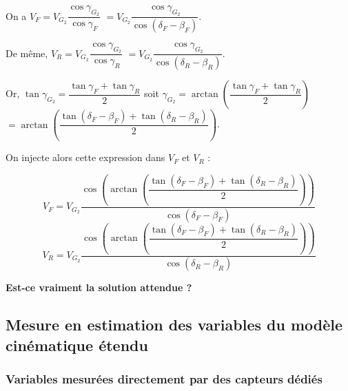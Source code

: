 \documentclass[11pt]{article}
\begin{document}
\begin{UPSTIcorrige}

On a $V_{F}  =V_{G_2} \dfrac{\cos \gamma_{G_2}}{\cos \gamma_{F}}$ 
$=V_{G_2} \dfrac{\cos \gamma_{G_2}}{\cos  \left(\delta_F-\beta_F \right)}$. 


De même, $V_{R}  =V_{G_2} \dfrac{\cos \gamma_{G_2}}{\cos \gamma_{R}}$ $=V_{G_2} \dfrac{\cos \gamma_{G_2}}{\cos  \left(\delta_R-\beta_R \right)}$.


Or, $\tan \gamma_{G_2} = \dfrac{\tan \gamma_F+\tan \gamma_R}{2}$ soit $ \gamma_{G_2} = \arctan\left(\dfrac{\tan \gamma_F+\tan \gamma_R}{2}\right)$ $= \arctan\left(\dfrac{\tan \left(\delta_F - \beta_F\right)+\tan \left(\delta_R - \beta_R\right)}{2}\right)$. 

On injecte alors cette expression dans $V_{F}$ et $V_R$ :

$$
V_F = V_{G_2} \dfrac{\cos \left( \arctan\left(\dfrac{\tan \left(\delta_F - \beta_F\right)+\tan \left(\delta_R - \beta_R\right)}{2}\right)\right)}{\cos  \left(\delta_F-\beta_F \right)} 
$$
$$
V_R = V_{G_2} \dfrac{\cos \left( \arctan\left(\dfrac{\tan \left(\delta_F - \beta_F\right)+\tan \left(\delta_R - \beta_R\right)}{2}\right)\right)}{\cos  \left(\delta_R-\beta_R \right)} 
$$

\textbf{Est-ce vraiment la solution attendue ?}

\end{UPSTIcorrige}


\subsection{Mesure en estimation des variables du modèle cinématique étendu}


\subsubsection{Variables mesurées directement par des capteurs dédiés}
\end{document}
